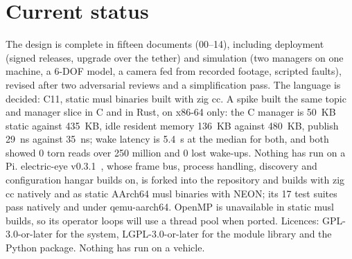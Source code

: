 \documentclass[conference]{IEEEtran}
\begin{document}
\section{Current status}

The design is complete in fifteen documents (00--14), including deployment
(signed releases, upgrade over the tether) and simulation (two managers on
one machine, a 6-DOF model, a camera fed from recorded footage, scripted
faults), revised after two adversarial reviews and a simplification pass. The
language is decided: C11, static musl binaries built with zig cc. A spike
built the same topic and manager slice in C and in Rust, on x86-64 only: the
C manager is 50~KB static against 435~KB, idle resident memory 136~KB against
480~KB, publish 29~ns against 35~ns; wake latency is 5.4~\textmu{}s at the
median for both, and both showed 0 torn reads over 250 million and 0 lost
wake-ups. Nothing has run on a Pi. electric-eye v0.3.1~\cite{bolat_eeye},
whose frame bus, process handling, discovery and configuration hangar builds
on, is forked into the repository and builds with zig cc natively and as
static AArch64 musl binaries with NEON; its 17 test suites pass natively and
under qemu-aarch64. OpenMP is unavailable in static musl builds, so its
operator loops will use a thread pool when ported. Licences: GPL-3.0-or-later
for the system, LGPL-3.0-or-later for the module library and the Python
package. Nothing has run on a vehicle.



\end{document}
